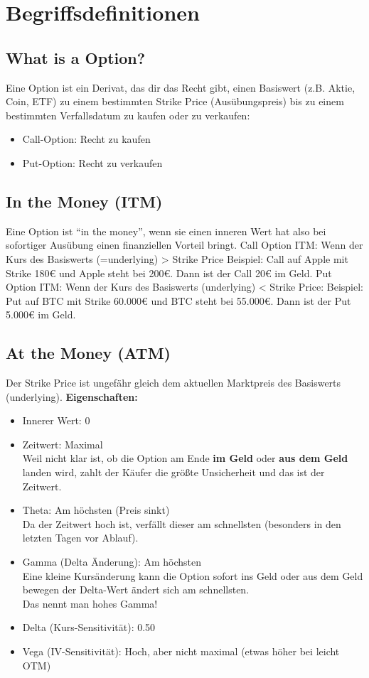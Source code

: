 \section{Begriffsdefinitionen}
\subsection{What is a Option?}
Eine Option ist ein Derivat, das dir das Recht gibt, einen Basiswert (z.B. Aktie, Coin, ETF) 
zu einem bestimmten Strike Price (Ausübungspreis) bis zu einem bestimmten Verfallsdatum zu 
kaufen oder zu verkaufen:
\begin{itemize}
    \item Call-Option: Recht zu kaufen
    \item Put-Option: Recht zu verkaufen
\end{itemize}

\subsection{In the Money (ITM)}
Eine Option ist “in the money”, wenn sie einen inneren Wert hat also bei sofortiger Ausübung einen finanziellen Vorteil bringt.
Call Option ITM: Wenn der Kurs des Basiswerts (=underlying) > Strike Price
Beispiel: Call auf Apple mit Strike 180€ und Apple steht bei 200€. Dann ist der Call 20€ im Geld.
Put Option ITM: Wenn der Kurs des Basiswerts (underlying) < Strike Price:
Beispiel: Put auf BTC mit Strike 60.000€ und BTC steht bei 55.000€. Dann ist der Put 5.000€ im Geld.

\subsection{At the Money (ATM)}
Der Strike Price ist ungefähr gleich dem aktuellen Marktpreis des Basiswerts (underlying).
\textbf{Eigenschaften:}
\begin{itemize}
  \item Innerer Wert: 0
  \item Zeitwert: Maximal \\
  Weil nicht klar ist, ob die Option am Ende \textbf{im Geld} oder \textbf{aus dem Geld} landen wird, zahlt der Käufer die größte Unsicherheit und das ist der Zeitwert.
  \item Theta: Am höchsten (Preis sinkt) \\
  Da der Zeitwert hoch ist, verfällt dieser am schnellsten (besonders in den letzten Tagen vor Ablauf).
  \item Gamma (Delta Änderung): Am höchsten \\
  Eine kleine Kursänderung kann die Option sofort ins Geld oder aus dem Geld bewegen \rightarrow der Delta-Wert ändert sich am schnellsten. \\
  \rightarrow Das nennt man hohes Gamma!
  \item Delta (Kurs-Sensitivität): 0.50
  \item Vega (IV-Sensitivität): Hoch, aber nicht maximal (etwas höher bei leicht OTM)
\end{itemize}


